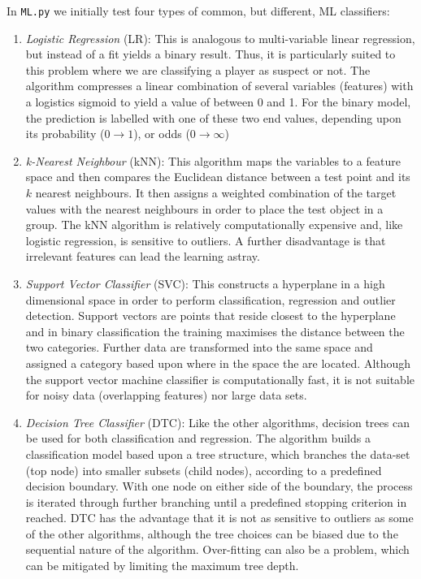 \documentclass[11pt]{article} %
\begin{document}
In {\tt ML.py} we initially test four types of common, but different, ML classifiers:
\begin{enumerate}
\item {\em Logistic Regression} (LR): This is analogous to multi-variable linear regression,
  but instead of a fit yields a binary result. Thus, it is particularly suited to this problem
  where we are classifying a player as suspect or not. The algorithm compresses a
  linear combination of several variables (features) with a logistics sigmoid to
 yield a value of between 0 and 1. For the binary model, the prediction is labelled with one of these two end values,
 depending upon its probability ($0\rightarrow1$), or odds ($0\rightarrow\infty$)

\item {\em k-Nearest Neighbour} (kNN): This  algorithm maps the variables to a feature space and then compares
the Euclidean distance between a test point and its $k$ nearest neighbours. It then assigns a
weighted combination of the target values with the nearest neighbours in order to place the test
object in a group. The kNN algorithm is relatively computationally expensive and, like logistic
regression, is sensitive to outliers. A further disadvantage is that irrelevant features can lead the
learning astray.

\item {\em Support Vector Classifier} (SVC): This constructs a hyperplane in a high dimensional space in order to perform classification,
regression and outlier detection. 
Support vectors are points that reside closest to the hyperplane and 
in binary classification the training maximises the distance between the two categories. Further data are
transformed into the same space and assigned a category based upon where in the space the are located.
Although the support vector machine classifier is computationally fast, it is not suitable 
for noisy data (overlapping features) nor large data sets.

\item {\em Decision Tree Classifier} (DTC): Like the other algorithms, decision trees can be used for both classification and regression.  The algorithm builds a
classification model based upon a tree structure, which branches the data-set (top node) into smaller subsets (child
nodes), according to a predefined decision boundary.  With one node on either side of the boundary, the process is
iterated through further branching until a predefined stopping criterion in reached. DTC has the advantage that it is
not as sensitive to outliers as some of the other algorithms, although the tree choices can be biased due to the
sequential nature of the algorithm.  Over-fitting can also be a problem, which can be mitigated by limiting the maximum
tree depth.
\end{enumerate}
\end{document}
